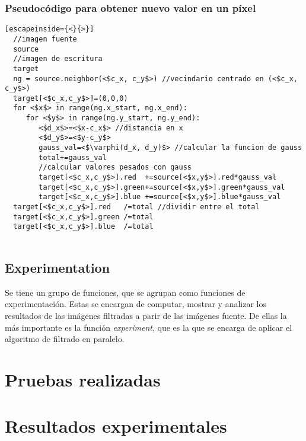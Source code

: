 \documentclass {article}
\begin{document}
\subsubsection{Pseudocódigo para obtener nuevo valor en un píxel}
\label{sec:pseudocodePixel}
\begin{lstlisting}[escapeinside={<}{>}]
  //imagen fuente
  source
  //imagen de escritura
  target
  ng = source.neighbor(<$c_x, c_y$>) //vecindario centrado en (<$c_x, c_y$>)
  target[<$c_x,c_y$>]=(0,0,0)
  for <$x$> in range(ng.x_start, ng.x_end):
     for <$y$> in range(ng.y_start, ng.y_end):
        <$d_x$>=<$x-c_x$> //distancia en x
        <$d_y$>=<$y-c_y$>
        gauss_val=<$\varphi(d_x, d_y)$> //calcular la funcion de gauss
        total+=gauss_val
        //calcular valores pesados con gauss
        target[<$c_x,c_y$>].red  +=source[<$x,y$>].red*gauss_val 
        target[<$c_x,c_y$>].green+=source[<$x,y$>].green*gauss_val
        target[<$c_x,c_y$>].blue +=source[<$x,y$>].blue*gauss_val
  target[<$c_x,c_y$>].red   /=total //dividir entre el total
  target[<$c_x,c_y$>].green /=total
  target[<$c_x,c_y$>].blue  /=total
        
\end{lstlisting}

\subsection{Experimentation}

Se tiene un grupo de funciones, que se agrupan como funciones de experimentación. Estas se encargan
de computar, mostrar y analizar los resultados de las imágenes filtradas a parir de las imágenes
fuente. De ellas la más importante es la función \textit{experiment}, que es la que se encarga de
aplicar el algoritmo de filtrado en paralelo.


\section{Pruebas realizadas}

\section{Resultados experimentales}
\end{document}
